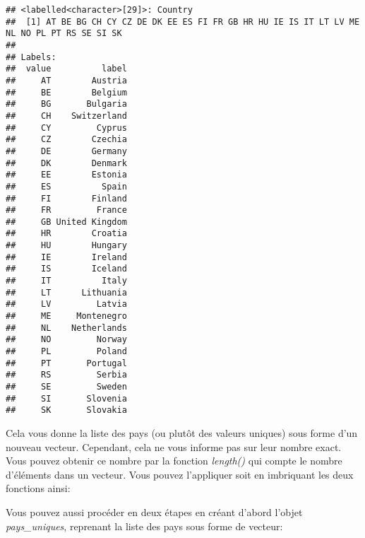 \documentclass[
]{book}
\newenvironment{Shaded}{\begin{snugshade}}{\end{snugshade}}
\newcommand{\FunctionTok}[1]{\textcolor[rgb]{0.00,0.00,0.00}{#1}}
\newcommand{\NormalTok}[1]{#1}
\newcommand{\OtherTok}[1]{\textcolor[rgb]{0.56,0.35,0.01}{#1}}
\newcommand{\SpecialCharTok}[1]{\textcolor[rgb]{0.00,0.00,0.00}{#1}}
\begin{document}
\begin{Shaded}
\end{Shaded}

\begin{verbatim}
## <labelled<character>[29]>: Country
##  [1] AT BE BG CH CY CZ DE DK EE ES FI FR GB HR HU IE IS IT LT LV ME NL NO PL PT RS SE SI SK
## 
## Labels:
##  value          label
##     AT        Austria
##     BE        Belgium
##     BG       Bulgaria
##     CH    Switzerland
##     CY         Cyprus
##     CZ        Czechia
##     DE        Germany
##     DK        Denmark
##     EE        Estonia
##     ES          Spain
##     FI        Finland
##     FR         France
##     GB United Kingdom
##     HR        Croatia
##     HU        Hungary
##     IE        Ireland
##     IS        Iceland
##     IT          Italy
##     LT      Lithuania
##     LV         Latvia
##     ME     Montenegro
##     NL    Netherlands
##     NO         Norway
##     PL         Poland
##     PT       Portugal
##     RS         Serbia
##     SE         Sweden
##     SI       Slovenia
##     SK       Slovakia
\end{verbatim}

Cela vous donne la liste des pays (ou plutôt des valeurs uniques) sous forme d'un nouveau vecteur. Cependant, cela ne vous informe pas sur leur nombre exact. Vous pouvez obtenir ce nombre par la fonction \emph{length()} qui compte le nombre d'éléments dans un vecteur. Vous pouvez l'appliquer soit en imbriquant les deux fonctions ainsi:

\begin{Shaded}
\end{Shaded}

Vous pouvez aussi procéder en deux étapes en créant d'abord l'objet \emph{pays\_uniques}, reprenant la liste des pays sous forme de vecteur:

\begin{Shaded}
\end{Shaded}
\end{document}
